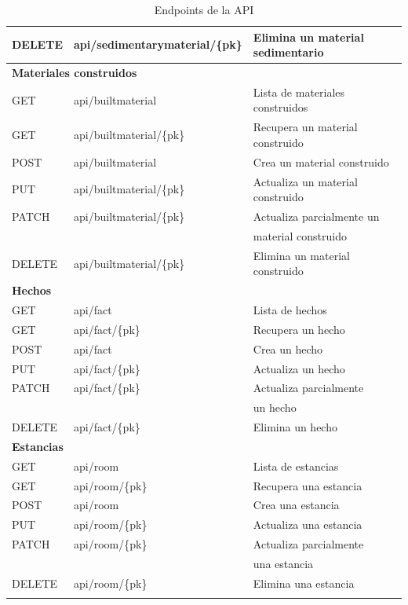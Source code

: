 \begin{longtable}[H]{|l|l|l|}
    DELETE & api/sedimentarymaterial/\{pk\} & Elimina un material sedimentario \\
    \hline\hline
    \multicolumn{3}{|l|}{\textbf{Materiales construidos}} \\
    \hline
    GET & api/builtmaterial & Lista de materiales construidos \\
    GET & api/builtmaterial/\{pk\} & Recupera un material construido \\
    POST & api/builtmaterial & Crea un material construido \\
    PUT & api/builtmaterial/\{pk\} & Actualiza un material construido \\
    PATCH & api/builtmaterial/\{pk\} & Actualiza parcialmente un \\
    &  & material construido \\
    DELETE & api/builtmaterial/\{pk\} & Elimina un material construido \\
    \hline\hline
    \multicolumn{3}{|l|}{\textbf{Hechos}} \\
    \hline
    GET & api/fact & Lista de hechos \\
    GET & api/fact/\{pk\} & Recupera un hecho \\
    POST & api/fact & Crea un hecho \\
    PUT & api/fact/\{pk\} & Actualiza un hecho \\
    PATCH & api/fact/\{pk\} & Actualiza parcialmente \\
    &  & un hecho \\
    DELETE & api/fact/\{pk\} & Elimina un hecho \\
    \hline\hline
    \multicolumn{3}{|l|}{\textbf{Estancias}} \\
    \hline
    GET & api/room & Lista de estancias \\
    GET & api/room/\{pk\} & Recupera una estancia \\
    POST & api/room & Crea una estancia \\
    PUT & api/room/\{pk\} & Actualiza una estancia \\
    PATCH & api/room/\{pk\} & Actualiza parcialmente \\
    &  & una estancia \\
    DELETE & api/room/\{pk\} & Elimina una estancia \\
    \hline

    \caption{Endpoints de la API}
    \label{tab:endpoints}
\end{longtable}

